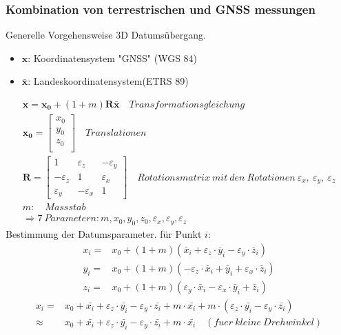 \documentclass[12pt]{article}
\begin{document}
\subsubsection{Kombination von terrestrischen und GNSS messungen}
Generelle Vorgehensweise 3D Datumsübergang.
\begin{itemize}
\item $\bm{{x}}$: Koordinatensystem "GNSS" (WGS 84)
\item $\bar{{{\bm{x}}}}$: Landeskoordinatensystem(ETRS 89)
\end{itemize}
\begin{gather*}
\bm{x} = \bm{x_0} + (1 + m) \bm{R} \bar{\bm{x}} \quad Transformationsgleichung\\
\bm{x_0} = \begin{bmatrix}
x_0 \\
y_0\\
z_0\\
\end{bmatrix} \quad Translationen \\
\bm{R} = \begin{bmatrix}
1 & \varepsilon_z & -\varepsilon_y \\
-\varepsilon_z & 1 &  \varepsilon_x \\
\varepsilon_y & - \varepsilon_x & 1
\end{bmatrix} \quad Rotationsmatrix\ mit \ den\ Rotationen\ \varepsilon_x,\ \varepsilon_y,\ \varepsilon_z \\
m:\quad Massstab \\
\Longrightarrow 7 \ Parametern: m,x_0,y_0,z_0,\varepsilon_x,\varepsilon_y,\varepsilon_z
\end{gather*}
Bestimmung der Datumsparameter. \newline
für Punkt $i$:
\begin{align*}
x_i = & x_0 + (1 + m)(\bar{x}_i + \varepsilon_z \cdot \bar{y}_i - \varepsilon_y \cdot \bar{z}_i)\\
y_i = & x_0 + (1 + m)(-\varepsilon_z \cdot \bar{x}_i + \bar{y}_i + \varepsilon_x \cdot \bar{z}_i) \\
z_i = & x_0 + (1 + m)(\varepsilon_y \cdot \bar{x}_i - \varepsilon_x \cdot \bar{y}_i + \bar{z}_i)
\end{align*} 
\begin{align*}
{x_i} = & {x}_0 + \bar{{x}_i} + \varepsilon_z \cdot \bar{{y}_i} - \varepsilon_y \cdot \bar{{z}_i} + m \cdot \bar{{x}_i} + m \cdot  (\varepsilon_z \cdot \bar{{y}_i} - \varepsilon_y \cdot \bar{{z}_i}) \\
\approx & {x}_0 + \bar{{x}_i} + \varepsilon_z \cdot \bar{{y}_i} - \varepsilon_y \cdot \bar{{z}_i} + m \cdot \bar{{x}_i} \quad (fuer\  kleine\  Drehwinkel)
\end{align*}
\end{document}
